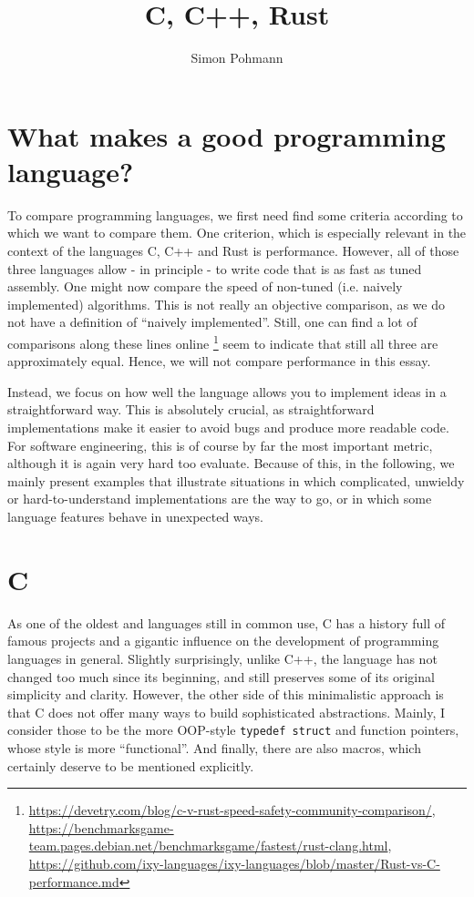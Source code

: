 \documentclass{scrartcl}
\title{C, C++, Rust}
\author{Simon Pohmann}
\begin{document}
\maketitle
\tableofcontents

\section*{What makes a good programming language?}

To compare programming languages, we first need find some criteria according to which we want to compare them.
One criterion, which is especially relevant in the context of the languages C, C++ and Rust is performance.
However, all of those three languages allow - in principle - to write code that is as fast as tuned assembly.
One might now compare the speed of non-tuned (i.e. naively implemented) algorithms.
This is not really an objective comparison, as we do not have a definition of ``naively implemented''.
Still, one can find a lot of comparisons along these lines online
\footnote{\href{https://devetry.com/blog/c-v-rust-speed-safety-community-comparison/}{https://devetry.com/blog/c-v-rust-speed-safety-community-comparison/}, \href{https://benchmarksgame-team.pages.debian.net/benchmarksgame/fastest/rust-clang.html}{https://benchmarksgame-team.pages.debian.net/benchmarksgame/fastest/rust-clang.html}, \href{https://github.com/ixy-languages/ixy-languages/blob/master/Rust-vs-C-performance.md}{https://github.com/ixy-languages/ixy-languages/blob/master/Rust-vs-C-performance.md}}
seem to indicate that still all three are approximately equal.
Hence, we will not compare performance in this essay.

Instead, we focus on how well the language allows you to implement ideas in a straightforward way.
This is absolutely crucial, as straightforward implementations make it easier to avoid bugs and produce more readable code.
For software engineering, this is of course by far the most important metric, although it is again very hard too evaluate.
Because of this, in the following, we mainly present examples that illustrate situations in which complicated, unwieldy or hard-to-understand implementations are the way to go, or in which some language features behave in unexpected ways.

\section{C}
As one of the oldest and languages still in common use, C has a history full of famous projects and a gigantic influence on the development of programming languages in general.
Slightly surprisingly, unlike C++, the language has not changed too much since its beginning, and still preserves some of its original simplicity and clarity.
However, the other side of this minimalistic approach is that C does not offer many ways to build sophisticated abstractions.
Mainly, I consider those to be the more OOP-style \lstinline{typedef struct} and function pointers, whose style is more ``functional''.
And finally, there are also macros, which certainly deserve to be mentioned explicitly.
\end{document}
